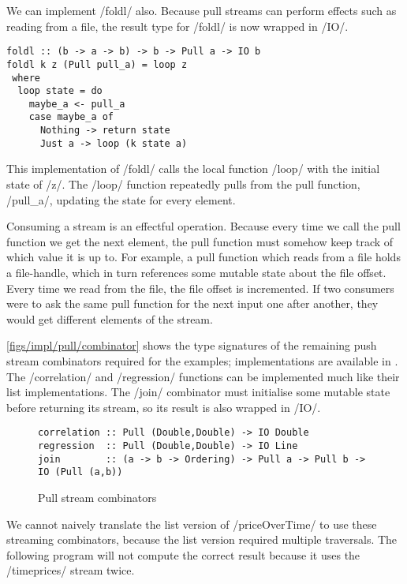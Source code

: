 We can implement \Hs/foldl/ also.
Because pull streams can perform effects such as reading from a file, the result type for \Hs/foldl/ is now wrapped in \Hs/IO/.

\begin{lstlisting}
foldl :: (b -> a -> b) -> b -> Pull a -> IO b
foldl k z (Pull pull_a) = loop z
 where
  loop state = do
    maybe_a <- pull_a
    case maybe_a of
      Nothing -> return state
      Just a -> loop (k state a)
\end{lstlisting}

This implementation of \Hs/foldl/ calls the local function \Hs/loop/ with the initial state of \Hs/z/.
The \Hs/loop/ function repeatedly pulls from the pull function, \Hs/pull_a/, updating the state for every element.

Consuming a stream is an effectful operation.
Because every time we call the pull function we get the next element, the pull function must somehow keep track of which value it is up to.
For example, a pull function which reads from a file holds a file-handle, which in turn references some mutable state about the file offset.
Every time we read from the file, the file offset is incremented.
If two consumers were to ask the same pull function for the next input one after another, they would get different elements of the stream.


\autoref{figs/impl/pull/combinator} shows the type signatures of the remaining push stream combinators required for the examples; implementations are available in .
The \Hs/correlation/ and \Hs/regression/ functions can be implemented much like their list implementations.
The \Hs/join/ combinator must initialise some mutable state before returning its stream, so its result is also wrapped in \Hs/IO/.

\begin{figure}
\begin{lstlisting}
correlation :: Pull (Double,Double) -> IO Double
regression  :: Pull (Double,Double) -> IO Line
join        :: (a -> b -> Ordering) -> Pull a -> Pull b -> IO (Pull (a,b))
\end{lstlisting}
\caption{Pull stream combinators}
\label{figs/impl/pull/combinator}
\end{figure}

We cannot naively translate the list version of \Hs/priceOverTime/ to use these streaming combinators, because the list version required multiple traversals.
The following program will not compute the correct result because it uses the \Hs/timeprices/ stream twice.

